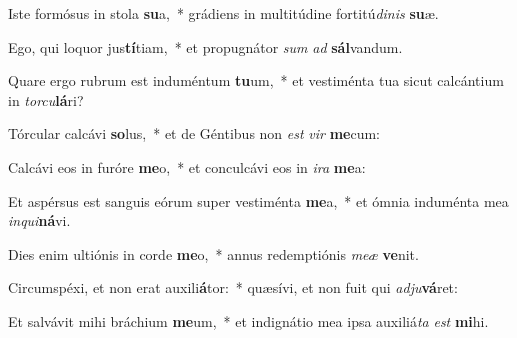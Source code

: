 \item Iste formósus in stola \textbf{su}a,~* grádiens in multitúdine fortitú\textit{di}\textit{nis} \textbf{su}æ.
\item Ego, qui loquor jus\textbf{tí}tiam,~* et propugnátor \textit{sum} \textit{ad} \textbf{sál}vandum.
\item Quare ergo rubrum est induméntum \textbf{tu}um,~* et vestiménta tua sicut calcántium in \textit{tor}\textit{cu}\textbf{lá}ri?
\item Tórcular calcávi \textbf{so}lus,~* et de Géntibus non \textit{est} \textit{vir} \textbf{me}cum:
\item Calcávi eos in furóre \textbf{me}o,~* et conculcávi eos in \textit{i}\textit{ra} \textbf{me}a:
\item Et aspérsus est sanguis eórum super vestiménta \textbf{me}a,~* et ómnia induménta mea \textit{in}\textit{qui}\textbf{ná}vi.
\item Dies enim ultiónis in corde \textbf{me}o,~* annus redemptiónis \textit{me}\textit{æ} \textbf{ve}nit.
\item Circumspéxi, et non erat auxili\textbf{á}tor:~* quæsívi, et non fuit qui \textit{ad}\textit{ju}\textbf{vá}ret:
\item Et salvávit mihi bráchium \textbf{me}um,~* et indignátio mea ipsa auxiliá\textit{ta} \textit{est} \textbf{mi}hi.
